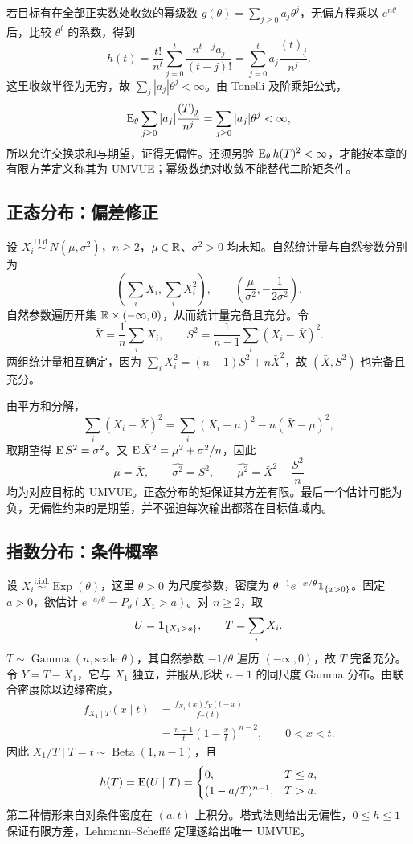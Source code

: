 若目标有在全部正实数处收敛的幂级数 $g(\theta)=\sum_{j\geq0}a_j\theta^j$，无偏方程乘以 $e^{n\theta}$ 后，比较 $\theta^t$ 的系数，得到
\[
 h(t)=\frac{t!}{n^t}\sum_{j=0}^t\frac{n^{t-j}a_j}{(t-j)!}
 =\sum_{j=0}^t a_j\frac{(t)_{\underline j}}{n^j}.
\]
这里收敛半径为无穷，故 $\sum_j|a_j|\theta^j<\infty$。由 Tonelli 及阶乘矩公式，
\[
 \operatorname{E}_\theta\sum_{j\geq0}|a_j|\frac{(T)_{\underline j}}{n^j}
 =\sum_{j\geq0}|a_j|\theta^j<\infty,
\]
所以允许交换求和与期望，证得无偏性。还须另验 $\operatorname{E}_\theta h(T)^2<\infty$，才能按本章的有限方差定义称其为 UMVUE；幂级数绝对收敛不能替代二阶矩条件。

\subsection{正态分布：偏差修正}

设 $X_i\overset{\mathrm{i.i.d.}}\sim N(\mu,\sigma^2)$，$n\geq2$，$\mu\in\mathbb R$、$\sigma^2>0$ 均未知。自然统计量与自然参数分别为
\[
 \left(\sum_iX_i,\sum_iX_i^2\right),\qquad
 \left(\frac\mu{\sigma^2},-\frac1{2\sigma^2}\right).
\]
自然参数遍历开集 $\mathbb R\times(-\infty,0)$，从而统计量完备且充分。令
\[
 \bar X=\frac1n\sum_iX_i,\qquad
 S^2=\frac1{n-1}\sum_i(X_i-\bar X)^2.
\]
两组统计量相互确定，因为 $\sum_iX_i^2=(n-1)S^2+n\bar X^2$，故 $(\bar X,S^2)$ 也完备且充分。

由平方和分解，
\[
 \sum_i(X_i-\bar X)^2
 =\sum_i(X_i-\mu)^2-n(\bar X-\mu)^2,
\]
取期望得 $\operatorname{E} S^2=\sigma^2$。又 $\operatorname{E}\bar X^2=\mu^2+\sigma^2/n$，因此
\[
 \widehat\mu=\bar X,\qquad
 \widehat{\sigma^2}=S^2,\qquad
 \widehat{\mu^2}=\bar X^2-\frac{S^2}{n}
\]
均为对应目标的 UMVUE。正态分布的矩保证其方差有限。最后一个估计可能为负，无偏性约束的是期望，并不强迫每次输出都落在目标值域内。

\subsection{指数分布：条件概率}

设 $X_i\overset{\mathrm{i.i.d.}}\sim\operatorname{Exp}(\theta)$，这里 $\theta>0$ 为尺度参数，密度为 $\theta^{-1}e^{-x/\theta}\mathbf 1_{\{x>0\}}$。固定 $a>0$，欲估计 $e^{-a/\theta}=P_\theta(X_1>a)$。对 $n\geq2$，取
\[
 U=\mathbf 1_{\{X_1>a\}},\qquad T=\sum_iX_i.
\]
$T\sim\operatorname{Gamma}(n,\text{scale }\theta)$，其自然参数 $-1/\theta$ 遍历 $(-\infty,0)$，故 $T$ 完备充分。令 $Y=T-X_1$，它与 $X_1$ 独立，并服从形状 $n-1$ 的同尺度 Gamma 分布。由联合密度除以边缘密度，
\begin{align*}
 f_{X_1\mid T}(x\mid t)
 &=\frac{f_{X_1}(x)f_Y(t-x)}{f_T(t)}\\
 &=\frac{n-1}{t}\left(1-\frac xt\right)^{n-2},
 \qquad0<x<t.
\end{align*}
因此 $X_1/T\mid T=t\sim\operatorname{Beta}(1,n-1)$，且
\[
 h(T)=\operatorname{E}(U\mid T)=
 \begin{cases}
  0,&T\leq a,\\
  (1-a/T)^{n-1},&T>a.
 \end{cases}
\]
第二种情形来自对条件密度在 $(a,t)$ 上积分。塔式法则给出无偏性，$0\leq h\leq1$ 保证有限方差，Lehmann--Scheff\'e 定理遂给出唯一 UMVUE。

